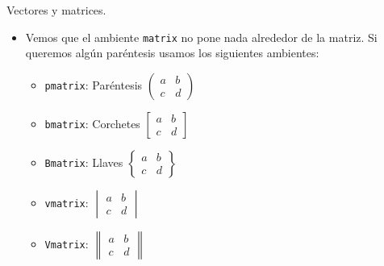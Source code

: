 \documentclass[dvipsnames,xcolor, handout]{beamer}
\theoremstyle{plain}
\theoremstyle{definition}
\begin{document}
\begin{frame}[fragile]{Vectores y matrices.}
    \begin{itemize}
        \item Vemos que el ambiente \verb!matrix! no pone nada alrededor de la matriz. Si queremos algún paréntesis usamos los siguientes ambientes:
        \begin{itemize}
            \item \verb!pmatrix!: Paréntesis $\begin{pmatrix}a & b \\ c & d \end{pmatrix}$\pause
            \item \verb!bmatrix!: Corchetes $\begin{bmatrix}a & b \\ c & d \end{bmatrix}$\pause
            \item \verb!Bmatrix!: Llaves $\begin{Bmatrix}a & b \\ c & d \end{Bmatrix}$\pause
            \item \verb!vmatrix!: $\begin{vmatrix}a & b \\ c & d \end{vmatrix}$\pause
            \item \verb!Vmatrix!: $\begin{Vmatrix}a & b \\ c & d \end{Vmatrix}$
        \end{itemize}
    \end{itemize}
\end{frame}
\end{document}
